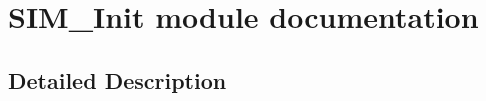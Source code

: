 \hypertarget{group___s_i_m___init__module}{}\section{S\+I\+M\+\_\+\+Init module documentation}
\label{group___s_i_m___init__module}


\subsection{Detailed Description}
